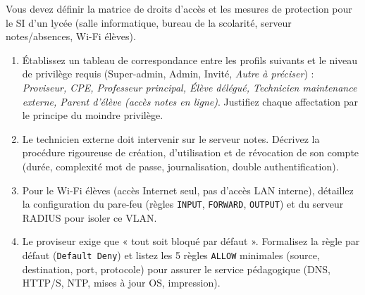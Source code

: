 \documentclass[11pt]{article}
\begin{document}
\begin{exercice}
Vous devez définir la matrice de droits d'accès et les mesures de protection pour le SI d'un lycée (salle informatique, bureau de la scolarité, serveur notes/absences, Wi-Fi élèves).
\begin{enumerate}
    \item Établissez un tableau de correspondance entre les profils suivants et le niveau de privilège requis (Super-admin, Admin, Invité, \textit{Autre à préciser}) : \textit{Proviseur, CPE, Professeur principal, Élève délégué, Technicien maintenance externe, Parent d'élève (accès notes en ligne)}. Justifiez chaque affectation par le principe du moindre privilège.
    \item Le technicien externe doit intervenir sur le serveur notes. Décrivez la procédure rigoureuse de création, d'utilisation et de révocation de son compte (durée, complexité mot de passe, journalisation, double authentification).
    \item Pour le Wi-Fi élèves (accès Internet seul, pas d'accès LAN interne), détaillez la configuration du pare-feu (règles \texttt{INPUT}, \texttt{FORWARD}, \texttt{OUTPUT}) et du serveur RADIUS pour isoler ce VLAN.
    \item Le proviseur exige que « tout soit bloqué par défaut ». Formalisez la règle par défaut (\texttt{Default Deny}) et listez les 5 règles \texttt{ALLOW} minimales (source, destination, port, protocole) pour assurer le service pédagogique (DNS, HTTP/S, NTP, mises à jour OS, impression).
\end{enumerate}
\end{exercice}
\end{document}
